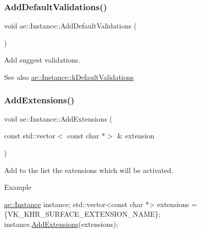 \subsubsection{\texorpdfstring{Add\+Default\+Validations()}{AddDefaultValidations()}}
{\footnotesize\ttfamily void ae\+::\+Instance\+::\+Add\+Default\+Validations (\begin{DoxyParamCaption}{ }\end{DoxyParamCaption})\hspace{0.3cm}{\ttfamily [noexcept]}}



Add suggest validations. 

\begin{DoxySeeAlso}{See also}
\hyperlink{classae_1_1_instance_a51fa0c0f46de73754c52841fc458d4ac}{ae\+::\+Instance\+::k\+Default\+Validations} 
\end{DoxySeeAlso}
\hypertarget{classae_1_1_instance_a880ed1eaf9b821ac616865821a5f15ef}{}\label{classae_1_1_instance_a880ed1eaf9b821ac616865821a5f15ef} 
\subsubsection{\texorpdfstring{Add\+Extensions()}{AddExtensions()}}
{\footnotesize\ttfamily void ae\+::\+Instance\+::\+Add\+Extensions (\begin{DoxyParamCaption}\item[{const std\+::vector$<$ const char $\ast$$>$ \&}]{extension }\end{DoxyParamCaption})\hspace{0.3cm}{\ttfamily [noexcept]}}



Add to the list the extensions which will be activated. 

Example 
\begin{DoxyCode}
\hyperlink{classae_1_1_instance}{ae::Instance} instance;
std::vector<const char *> extensions =
\{VK\_KHR\_SURFACE\_EXTENSION\_NAME\};
instance.\hyperlink{classae_1_1_instance_a880ed1eaf9b821ac616865821a5f15ef}{AddExtensions}(extensions);
\end{DoxyCode}
 \hypertarget{classae_1_1_instance_ae00908ee44223a209184015514a35685}{}\label{classae_1_1_instance_ae00908ee44223a209184015514a35685} 
